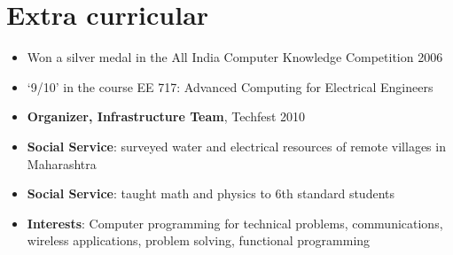 \documentclass[12pt]{article}
\begin{document}
\section*{Extra curricular}
\begin{itemize}
\item Won a silver medal in the All India Computer Knowledge Competition 2006 
\item `9/10' in the course EE 717: Advanced Computing for Electrical Engineers 
\item \textbf{Organizer, Infrastructure Team}, Techfest 2010 
\item \textbf{Social Service}: surveyed water and electrical resources of remote villages in Maharashtra 
\item \textbf{Social Service}: taught math and physics to 6th standard students 
\item \textbf{Interests}:  Computer programming for technical problems, communications, wireless applications, problem solving, functional programming 
\end{itemize}
\end{document}
